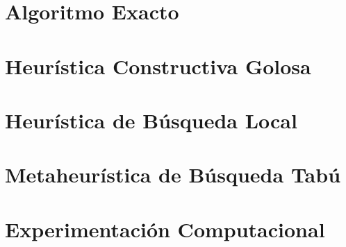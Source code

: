 \documentclass[11pt, a4paper, spanish]{article}
\begin{document}
    \section{Algoritmo Exacto}
        
        \pagebreak

    \section{Heur\'istica Constructiva Golosa}
        
        \pagebreak

    \section{Heur\'istica de B\'usqueda Local}
        
        \pagebreak

    \section{Metaheur\'istica de B\'usqueda Tab\'u}
        
        \pagebreak

    \section{Experimentaci\'on Computacional}
        
        \pagebreak
\end{document}
